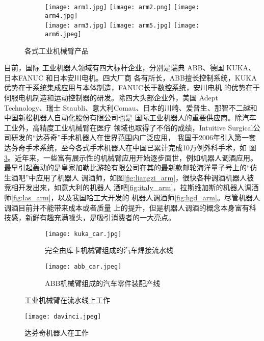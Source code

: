 \begin{figure}
\centering
\begin{subfigure}{1.\textwidth}
  \centering
  \texttt{[image: arm1.jpg]}
  \texttt{[image: arm2.png]}
  \texttt{[image: arm4.jpg]}\\
  \texttt{[image: arm3.jpg]}
  \texttt{[image: arm5.jpg]}
  \texttt{[image: arm6.jpeg]}
\end{subfigure}%
\caption{各式工业机械臂产品}
\label{fig:arms}
\end{figure}


目前，国际
工业机器人领域有四大标杆企业，分别是瑞典 ABB、德国 KUKA、日本FANUC 和日本安川电机。四大厂商
各有所长，ABB擅长控制系统，KUKA优势在于系统集成应用与本体制造，FANUC长于数控系统，安川电机
的优势在于伺服电机制造和运动控制器的研发。除四大头部企业外，美国 Adept Technology、瑞士
Staubli、意大利Comau、日本的川崎、爱普生、那智不二越和中国新松机器人自动化股份有限公司也是
国际工业机器人的重要供应商\cite{huangxihuanReview}。除汽车工业外，高精度工业机械臂在医疗
领域也取得了不俗的成绩，Intuitive Surgical公司研发的“达芬奇”手术机器人在世界范围内广泛应用，
我国于2006年引入第一套达芬奇手术系统，至今各式手术机器人在中国已累计完成10万例外科手术，如
图\ref{fig:davinci}。近年来，一些富有展示性的机械臂应用开始逐步面世，例如机器人调酒应用。
最早引起轰动的是皇家加勒比游轮有限公司在其的最新款邮轮海洋量子号上的“仿生酒吧”中应用了机器人
调酒师，如图\ref{fig:liangzi_arm}，很快各种调酒机器人被竞相开发出来，如意大利的机器人
酒吧\ref{fig:italy_arm}，拉斯维加斯的机器人调酒师\ref{fig:las_arm}，以及我国哈工大开发的
机器人调酒师\ref{fig:hgd_arm}。尽管机器人调酒目前并不能带来成本或者质量
上的提升，但是机器人调酒的概念本身富有科技感，新鲜有趣充满噱头，是吸引消费者的一大亮点。

\begin{figure}
\centering
\begin{subfigure}{.5\textwidth}
  \centering
  \texttt{[image: kuka\_car.jpg]}
  \caption{完全由库卡机械臂组成的汽车焊接流水线}
\end{subfigure}%
\begin{subfigure}{.5\textwidth}
  \centering
  \texttt{[image: abb\_car.jpeg]}
  \caption{ABB机械臂组成的汽车零件装配产线}
\end{subfigure}
\caption{工业机械臂在流水线上工作}
\label{fig:armcar}
\end{figure}

\begin{figure}[ht] %
  \centering
  \texttt{[image: davinci.jpeg]}
  \caption{达芬奇机器人在工作}
  \label{fig:davinci}
\end{figure}

